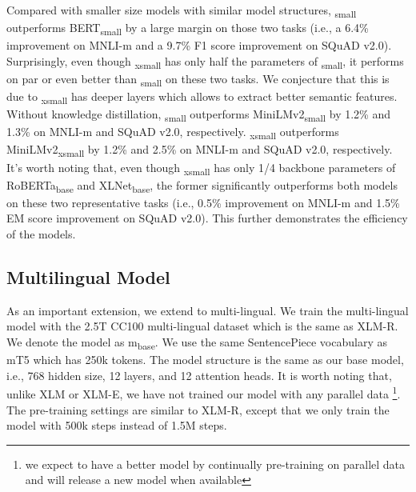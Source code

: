 Compared with smaller size models with similar model structures, {\ModelName}\textsubscript{small} outperforms BERT\textsubscript{small}  \citep{wang2020minilm} by a large margin on those two tasks (i.e., a 6.4\% improvement on MNLI-m and a 9.7\% F1 score improvement on SQuAD v2.0). Surprisingly, even though  {\ModelName}\textsubscript{xsmall} has only half the parameters of {\ModelName}\textsubscript{small}, it performs on par or even better than {\ModelName}\textsubscript{small} on these two tasks. We conjecture that this is due to {\ModelName}\textsubscript{xsmall} has deeper layers which allows to extract better semantic features. Without knowledge distillation, {\ModelName}\textsubscript{small}  outperforms {MiniLMv2}\textsubscript{small} \citep{wang2020minilmv2} by 1.2\% and 1.3\% on MNLI-m and SQuAD v2.0, respectively. {\ModelName}\textsubscript{xsmall} outperforms {MiniLMv2}\textsubscript{xsmall} \citep{wang2020minilmv2} by 1.2\% and 2.5\% on MNLI-m and SQuAD v2.0, respectively.  It's worth noting that, even though {\ModelName}\textsubscript{xsmall} has only 1/4 backbone parameters of RoBERTa\textsubscript{base} and XLNet\textsubscript{base}, the former significantly outperforms both models on these two representative tasks (i.e., 0.5\% improvement on MNLI-m and 1.5\% EM score improvement on SQuAD v2.0). This further demonstrates the efficiency of the {\ModelName} models.

\subsection{Multilingual Model} As an important extension,  we extend {\ModelName} to multi-lingual. We train the multi-lingual model with the 2.5T CC100 multi-lingual dataset which is the same as XLM-R. We denote the model as m{\ModelName}\textsubscript{base}. We use the same SentencePiece vocabulary as mT5 which has 250k tokens. The model structure is the same as our base model, i.e., 768 hidden size, 12 layers, and 12 attention heads. It is worth noting that, unlike XLM or XLM-E, we have not trained our model with any parallel data \footnote{we expect to have a better model by continually pre-training on parallel data and will release a new model when available}. The pre-training settings are similar to XLM-R, except that we only train the model with 500k steps instead of 1.5M steps.

